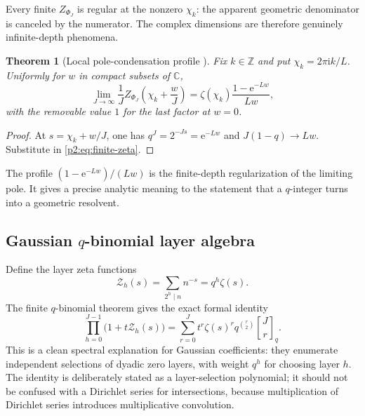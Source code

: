 \documentclass[11pt]{article}
\numberwithin{equation}{section}
\newtheorem{theorem}{Theorem}[section]
\theoremstyle{definition}
\theoremstyle{remark}
\newcommand{\Z}{\mathbb Z}
\newcommand{\C}{\mathbb C}
\newcommand{\e}{\mathrm e}
\newcommand{\ii}{\mathrm i}
\newcommand{\qbinom}[3]{\genfrac{[}{]}{0pt}{}{#1}{#2}_{#3}}
\begin{document}
Every finite $Z_{\Phi_J}$ is regular at the nonzero $\chi_k$: the apparent
geometric denominator is canceled by the numerator.  The complex dimensions are
therefore genuinely infinite-depth phenomena.

\begin{theorem}[Local pole-condensation profile \NewResult]
\label{p2:thm:condensation}
Fix $k\in\Z$ and put $\chi_k=2\pi\ii k/L$.  Uniformly for $w$ in compact subsets
of $\C$,
\begin{equation}
 \lim_{J\to\infty}\frac1J
 Z_{\Phi_J}\!\left(\chi_k+\frac{w}{J}\right)
 =\zeta(\chi_k)\frac{1-\e^{-Lw}}{Lw},                     \label{p2:eq:condensation}
\end{equation}
with the removable value $1$ for the last factor at $w=0$.
\end{theorem}

\begin{proof}
At $s=\chi_k+w/J$, one has
$q^J=2^{-Js}=\e^{-Lw}$ and
$J(1-q)\to Lw$.  Substitute in \eqref{p2:eq:finite-zeta}.
\end{proof}

The profile $(1-\e^{-Lw})/(Lw)$ is the finite-depth regularization of the limiting
pole.  It gives a precise analytic meaning to the statement that a $q$-integer
turns into a geometric resolvent.

\subsection{Gaussian $q$-binomial layer algebra}

Define the layer zeta functions
\begin{equation}
 \mathcal Z_h(s)=\sum_{2^h\mid n}n^{-s}=q^h\zeta(s).        \label{p2:eq:layer-zeta}
\end{equation}
The finite $q$-binomial theorem gives the exact formal identity
\begin{equation}
 \boxed{
 \prod_{h=0}^{J-1}\bigl(1+t\mathcal Z_h(s)\bigr)
 =\sum_{r=0}^{J}t^r\zeta(s)^r q^{\binom r2}
   \qbinom{J}{r}{q}.}                                     \label{p2:eq:q-layer}
\end{equation}
This is a clean spectral explanation for Gaussian coefficients: they enumerate
independent selections of dyadic zero layers, with weight $q^h$ for choosing
layer $h$.  The identity is deliberately stated as a layer-selection polynomial;
it should not be confused with a Dirichlet series for intersections, because
multiplication of Dirichlet series introduces multiplicative convolution.
\end{document}
